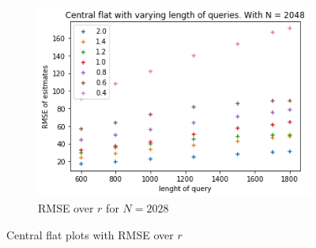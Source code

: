 \documentclass[11pt]{article}
\theoremstyle{definition}
\begin{document}
\begin{figure}[H]
\begin{subfigure}{.3\textwidth}
  \includegraphics[width=\linewidth]{figures/central_flat/varying_r/cen_flat_varying_length_N=2048.png}
  \caption{RMSE over $r$ for $N=2028$}
  \label{fig:cen_r_sub3}
\end{subfigure}
\caption{Central flat plots with RMSE over $r$}
\label{fig:plt_cen_r}
\end{figure}
\end{document}
